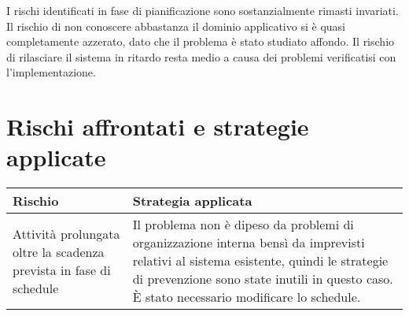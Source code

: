 I rischi identificati in fase di pianificazione sono sostanzialmente rimasti invariati. Il rischio di non conoscere abbastanza il dominio applicativo si è quasi completamente azzerato, dato che il problema è stato studiato affondo. Il rischio di rilasciare il sistema in ritardo resta medio a causa dei problemi verificatisi con l'implementazione.

\section{Rischi affrontati e strategie applicate}
\begin{table}[ht]
 \centering
 \begin{tabular}{|p{4cm}|p{9cm}|}
  \hline
  \rowcolor{Gray}\textbf{Rischio}			& \textbf{Strategia applicata}\\
  \hline
  Attività prolungata oltre la scadenza prevista in fase di schedule	& Il problema non è dipeso da problemi di organizzazione interna bensì da imprevisti relativi al sistema esistente, quindi le strategie di prevenzione sono state inutili in questo caso. È stato necessario modificare lo schedule.\\
  \hline
 \end{tabular}
\end{table}
